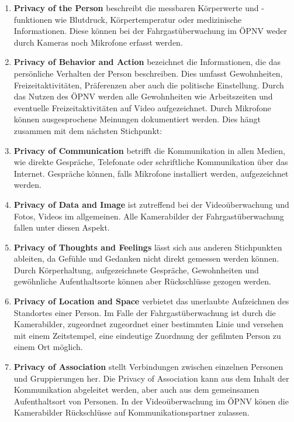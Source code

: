 \begin{enumerate}
      \item {\bfseries Privacy of the Person} beschreibt die messbaren Körperwerte und -funk\-tionen wie Blutdruck, Körpertemperatur oder medizinische Informationen. Diese können bei der Fahrgastüberwachung
            im ÖPNV weder durch Kameras noch Mikrofone erfasst werden.
      \item {\bfseries Privacy of Behavior and Action}  bezeichnet die Informationen, die das persönliche Verhalten der Person beschreiben. Dies umfasst Gewohnheiten, Freizeitaktivitäten,
            Präferenzen aber auch die politische Einstellung. Durch das Nutzen des ÖPNV werden alle Gewohnheiten wie Arbeitszeiten und eventuelle Freizeitaktivitäten auf Video aufgezeichnet. Durch Mikrofone können
            ausgesprochene Meinungen dokumentiert werden. Dies hängt zusammen mit dem nächsten Stichpunkt:
      \item {\bfseries Privacy of Communication} betrifft die Kommunikation in allen Medien, wie direkte Gespräche, Telefonate oder schriftliche Kommunikation über das Internet. Gespräche können, falls Mikrofone installiert werden,
            aufgezeichnet werden.
      \item {\bfseries Privacy of Data and Image}  ist zutreffend bei der Videoüberwachung und Fotos, Videos im allgemeinen. Alle Kamerabilder der Fahrgastüberwachung fallen unter diesen Aspekt.
      \item {\bfseries Privacy of Thoughts and Feelings} lässt sich aus anderen Stichpunkten ableiten, da Gefühle und Gedanken nicht direkt gemessen werden können. Durch Körperhaltung, aufgezeichnete Gespräche,
            Gewohnheiten und gewöhnliche Aufenthaltsorte können aber Rückschlüsse gezogen werden.
      \item {\bfseries Privacy of Location and Space} verbietet das unerlaubte Aufzeichnen des Standortes einer Person. Im Falle der Fahrgastüberwachung ist durch die Kamerabilder, zugeordnet zugeordnet
            einer bestimmten Linie und versehen mit einem Zeitstempel, eine eindeutige Zuordnung der gefilmten Person zu einem Ort möglich.
      \item {\bfseries Privacy of Association} stellt Verbindungen zwischen einzelnen Personen und Gruppierungen her. Die \glqq{}Privacy of Association\grqq{} kann aus dem Inhalt der Kommunikation abgeleitet werden,
            aber auch aus dem gemeinsamen Aufenthaltsort von Personen. In der Videoüberwachung im ÖPNV könen die Kamerabilder Rückschlüsse auf Kommunikationspartner zulassen.
\end{enumerate}


